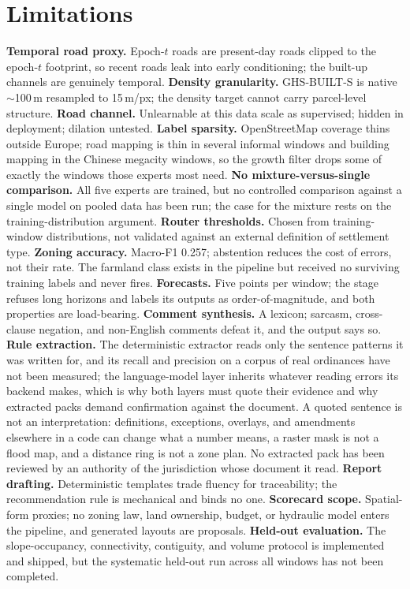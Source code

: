 \documentclass[11pt]{article}
\begin{document}
\section{Limitations}
\label{sec:limitations}
\textbf{Temporal road proxy.} Epoch-$t$ roads are present-day roads
clipped to the epoch-$t$ footprint, so recent roads leak into early
conditioning; the built-up channels are genuinely temporal.
\textbf{Density granularity.} GHS-BUILT-S is native $\sim$100\,m
resampled to 15\,m/px; the density target cannot carry parcel-level
structure.
\textbf{Road channel.} Unlearnable at this data scale as supervised;
hidden in deployment; dilation untested.
\textbf{Label sparsity.} OpenStreetMap coverage thins outside Europe;
road mapping is thin in several informal windows and building mapping
in the Chinese megacity windows, so the growth filter drops some of
exactly the windows those experts most need.
\textbf{No mixture-versus-single comparison.} All five experts are
trained, but no controlled comparison against a single model on pooled
data has been run; the case for the mixture rests on the
training-distribution argument.
\textbf{Router thresholds.} Chosen from training-window
distributions, not validated against an external definition of
settlement type.
\textbf{Zoning accuracy.} Macro-F1 0.257; abstention reduces the cost
of errors, not their rate. The farmland class exists in the pipeline
but received no surviving training labels and never fires.
\textbf{Forecasts.} Five points per window; the stage refuses long
horizons and labels its outputs as order-of-magnitude, and both
properties are load-bearing.
\textbf{Comment synthesis.} A lexicon; sarcasm, cross-clause negation,
and non-English comments defeat it, and the output says so.
\textbf{Rule extraction.} The deterministic extractor reads only the
sentence patterns it was written for, and its recall and precision on
a corpus of real ordinances have not been measured; the language-model
layer inherits whatever reading errors its backend makes, which is why
both layers must quote their evidence and why extracted packs demand
confirmation against the document. A quoted sentence is not an
interpretation: definitions, exceptions, overlays, and amendments
elsewhere in a code can change what a number means, a raster mask is
not a flood map, and a distance ring is not a zone plan. No extracted
pack has been reviewed by an authority of the jurisdiction whose
document it read.
\textbf{Report drafting.} Deterministic templates trade fluency for
traceability; the recommendation rule is mechanical and binds no one.
\textbf{Scorecard scope.} Spatial-form proxies; no zoning law, land
ownership, budget, or hydraulic model enters the pipeline, and
generated layouts are proposals.
\textbf{Held-out evaluation.} The slope-occupancy, connectivity,
contiguity, and volume protocol is implemented and shipped, but the
systematic held-out run across all windows has not been completed.
\end{document}
